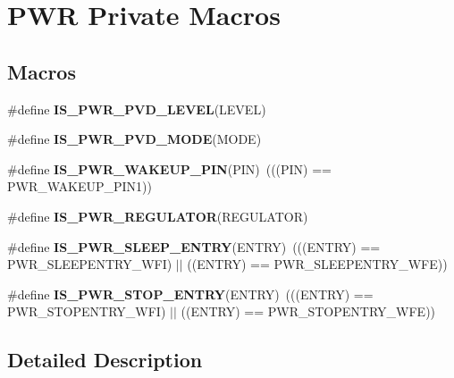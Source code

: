 \hypertarget{group___p_w_r___private___macros}{}\section{P\+WR Private Macros}
\label{group___p_w_r___private___macros}
\subsection*{Macros}
\begin{DoxyCompactItemize}
\item 
\#define {\bfseries I\+S\+\_\+\+P\+W\+R\+\_\+\+P\+V\+D\+\_\+\+L\+E\+V\+EL}(L\+E\+V\+EL)
\item 
\#define {\bfseries I\+S\+\_\+\+P\+W\+R\+\_\+\+P\+V\+D\+\_\+\+M\+O\+DE}(M\+O\+DE)
\item 
\mbox{\label{group___p_w_r___private___macros_gac6fcc59d6ff95b8feda1b228517f9c3f}} 
\#define {\bfseries I\+S\+\_\+\+P\+W\+R\+\_\+\+W\+A\+K\+E\+U\+P\+\_\+\+P\+IN}(P\+IN)~(((P\+IN) == P\+W\+R\+\_\+\+W\+A\+K\+E\+U\+P\+\_\+\+P\+I\+N1))
\item 
\#define {\bfseries I\+S\+\_\+\+P\+W\+R\+\_\+\+R\+E\+G\+U\+L\+A\+T\+OR}(R\+E\+G\+U\+L\+A\+T\+OR)
\item 
\mbox{\label{group___p_w_r___private___macros_ga9b36a9c213a77d36340788b2e7e277ff}} 
\#define {\bfseries I\+S\+\_\+\+P\+W\+R\+\_\+\+S\+L\+E\+E\+P\+\_\+\+E\+N\+T\+RY}(E\+N\+T\+RY)~(((E\+N\+T\+RY) == P\+W\+R\+\_\+\+S\+L\+E\+E\+P\+E\+N\+T\+R\+Y\+\_\+\+W\+FI) $\vert$$\vert$ ((E\+N\+T\+RY) == P\+W\+R\+\_\+\+S\+L\+E\+E\+P\+E\+N\+T\+R\+Y\+\_\+\+W\+FE))
\item 
\mbox{\label{group___p_w_r___private___macros_ga4a94eb1f400dec6e486fbc229cbea8a0}} 
\#define {\bfseries I\+S\+\_\+\+P\+W\+R\+\_\+\+S\+T\+O\+P\+\_\+\+E\+N\+T\+RY}(E\+N\+T\+RY)~(((E\+N\+T\+RY) == P\+W\+R\+\_\+\+S\+T\+O\+P\+E\+N\+T\+R\+Y\+\_\+\+W\+FI) $\vert$$\vert$ ((E\+N\+T\+RY) == P\+W\+R\+\_\+\+S\+T\+O\+P\+E\+N\+T\+R\+Y\+\_\+\+W\+FE))
\end{DoxyCompactItemize}


\subsection{Detailed Description}


